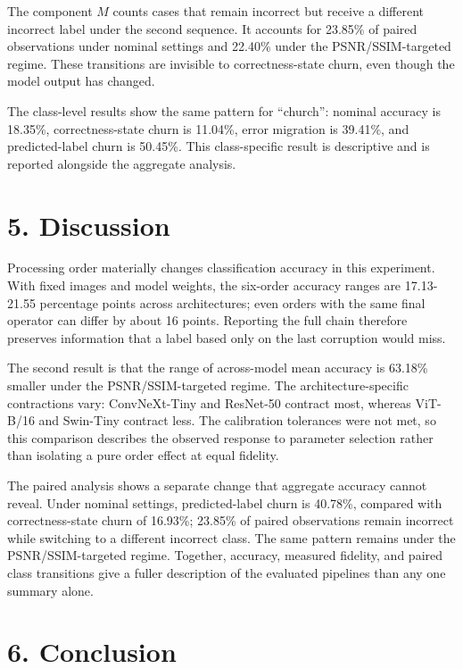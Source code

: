 \documentclass[10pt,twocolumn]{article}
\begin{document}
The component \(M\) counts cases that remain incorrect but receive a
different incorrect label under the second sequence. It accounts for
23.85\% of paired observations under nominal settings and 22.40\% under
the PSNR/SSIM-targeted regime. These transitions are invisible to
correctness-state churn, even though the model output has changed.

The class-level results show the same pattern for ``church'': nominal
accuracy is 18.35\%, correctness-state churn is 11.04\%, error migration
is 39.41\%, and predicted-label churn is 50.45\%. This class-specific
result is descriptive and is reported alongside the aggregate analysis.

\section{5. Discussion}\label{discussion}

Processing order materially changes classification accuracy in this
experiment. With fixed images and model weights, the six-order accuracy
ranges are 17.13-21.55 percentage points across architectures; even
orders with the same final operator can differ by about 16 points.
Reporting the full chain therefore preserves information that a label
based only on the last corruption would miss.

The second result is that the range of across-model mean accuracy is
63.18\% smaller under the PSNR/SSIM-targeted regime. The
architecture-specific contractions vary: ConvNeXt-Tiny and ResNet-50
contract most, whereas ViT-B/16 and Swin-Tiny contract less. The
calibration tolerances were not met, so this comparison describes the
observed response to parameter selection rather than isolating a pure
order effect at equal fidelity.

The paired analysis shows a separate change that aggregate accuracy
cannot reveal. Under nominal settings, predicted-label churn is 40.78\%,
compared with correctness-state churn of 16.93\%; 23.85\% of paired
observations remain incorrect while switching to a different incorrect
class. The same pattern remains under the PSNR/SSIM-targeted regime.
Together, accuracy, measured fidelity, and paired class transitions give
a fuller description of the evaluated pipelines than any one summary
alone.

\section{6. Conclusion}\label{conclusion}
\end{document}
